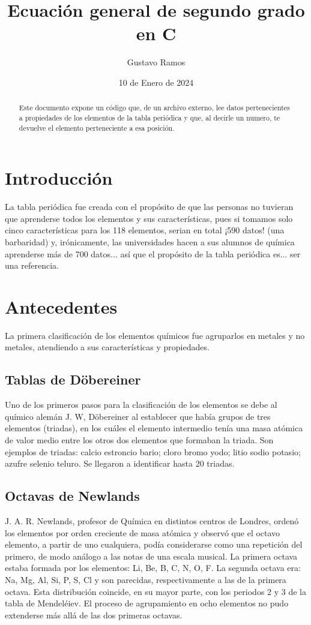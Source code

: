 \documentclass[12pt]{article}
\title{Ecuación general de segundo grado en C}
\author{Gustavo Ramos}
\date{10 de Enero de 2024}
\begin{document}
	\maketitle
	\begin{abstract}
		Este documento expone un código que, de un archivo externo, lee datos pertenecientes a propiedades de los elementos de la tabla periódica y que, al decirle un numero, te devuelve el elemento perteneciente a esa posición.
	\end{abstract}
	\newpage
	\tableofcontents
	\newpage
	\begin{multicols}{2}
		\section{Introducción}
			La tabla periódica fue creada con el propósito de que las personas no tuvieran que aprenderse todos los elementos y sus características, pues si tomamos solo cinco características para los 118 elementos, serian en total ¡590 datos! (una barbaridad) y, irónicamente, las universidades hacen a sus alumnos de química aprenderse más de 700 datos... así que el propósito de la tabla periódica es... ser una referencia.
		\section{Antecedentes}
			La primera clasificación de los elementos químicos fue agruparlos en metales y no metales, atendiendo a sus características y propiedades.
			\subsection{Tablas de Döbereiner}
				Uno de los primeros pasos para la clasificación de los elementos se debe al químico alemán J. W, Döbereiner al establecer que había grupos de tres elementos (triadas), en los cuáles el elemento intermedio tenía una masa atómica de valor medio entre los otros dos elementos que formaban la triada. Son ejemplos de triadas: calcio estroncio bario; cloro bromo yodo; litio sodio potasio; azufre selenio teluro. Se llegaron a identificar hasta 20 triadas.
			\subsection{Octavas de Newlands}
				J. A. R. Newlands, profesor de Química en distintos centros de Londres, ordenó los elementos por orden creciente de masa atómica y observó que el octavo elemento, a partir de uno cualquiera, podía considerarse como una repetición del primero, de modo análogo a las notas de una escala musical. La primera octava estaba formada por los elementos: Li, Be, B, C, N, O, F. La segunda octava era: Na, Mg, Al, Si, P, S, Cl y son parecidas, respectivamente a las de la primera octava. Esta distribución coincide, en su mayor parte, con los periodos 2 y 3 de la tabla de Mendeléiev. El proceso de agrupamiento en ocho elementos no pudo extenderse más allá de las dos primeras octavas.

\end{multicols}
\end{document}
